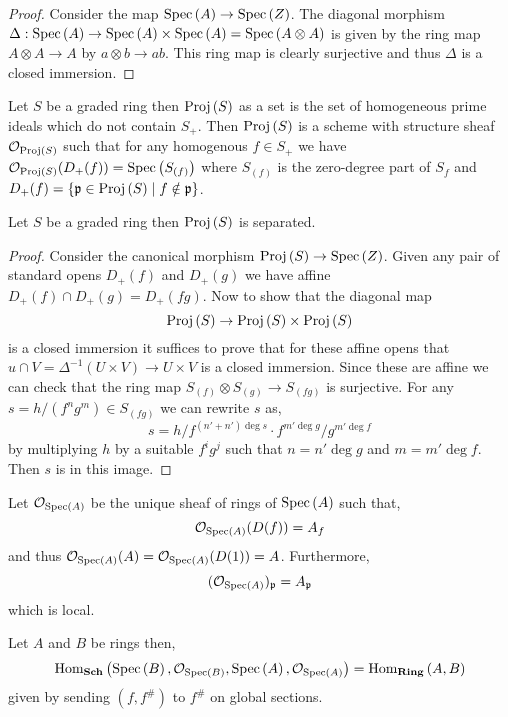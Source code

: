 \documentclass[12pt]{article}
\begin{document}
\begin{proof}
Consider the map $\mathrm{Spec}\left( A \right) \to \mathrm{Spec}\left( Z \right)$. The diagonal morphism $\Delta : \mathrm{Spec}\left( A \right) \to \mathrm{Spec}\left( A \right) \times \mathrm{Spec}\left( A \right) = \mathrm{Spec}\left( A \otimes A \right)$ is given by the ring map $A \otimes A \to  A$ by $a \otimes b \to ab$. This ring map is clearly surjective and thus $\Delta$ is a closed immersion. 
\end{proof}

\begin{definition}
Let $S$ be a graded ring then $\mathrm{Proj}\left( S \right)$ as a set is the set of homogeneous prime ideals which do not contain $S_+$. Then $\mathrm{Proj}\left( S \right)$ is a scheme with structure sheaf $\mathcal{O}_{\mathrm{Proj}\left( S \right)}$ such that for any homogenous $f \in S_+$ we have $\mathcal{O}_{\mathrm{Proj}\left( S \right)}(D_+(f)) = \mathrm{Spec}\left( S_{(f)} \right)$ where $S_{(f)}$ is the zero-degree part of $S_f$ and $D_+(f) = \{ \mathfrak{p} \in \mathrm{Proj}\left( S \right) \mid f \notin \mathfrak{p} \}$. 
\end{definition}

\begin{proposition}
Let $S$ be a graded ring then $\mathrm{Proj}\left( S \right)$ is separated. 
\end{proposition}

\begin{proof}
Consider the canonical morphism $\mathrm{Proj}\left( S \right) \to \mathrm{Spec}\left( Z \right)$. Given any pair of standard opens $D_+(f)$ and $D_+(g)$ we have affine $D_+(f) \cap D_+(g) = D_+(fg)$. Now to show that the diagonal map
\[ \mathrm{Proj}\left( S \right) \to \mathrm{Proj}\left( S \right) \times \mathrm{Proj}\left( S \right) \]
is a closed immersion it suffices to prove that for these affine opens that $u \cap V = \Delta^{-1}(U \times V) \to U \times V$ is a closed immersion. Since these are affine we can check that the ring map $S_{(f)} \otimes S_{(g)} \to S_{(fg)}$ is surjective. For any $s = h/(f^n g^m) \in S_{(fg)}$ we can rewrite $s$ as,
\[ s = h/f^{(n' + n') \deg{s}} \cdot f^{m' \deg{g}} / g^{m' \deg{f}} \]
by multiplying $h$ by a suitable $f^ig^j$ such that $n = n' \deg{g}$ and $m = m' \deg{f}$. Then $s$ is in this image. 
\end{proof}

\begin{definition}
Let $\mathcal{O}_{\mathrm{Spec}\left( A \right)}$ be the unique sheaf of rings of $\mathrm{Spec}\left( A \right)$ such that,
\[ \mathcal{O}_{\mathrm{Spec}\left( A \right)}(D(f)) = A_f \]
and thus $\mathcal{O}_{\mathrm{Spec}\left( A \right)}(A) = \mathcal{O}_{\mathrm{Spec}\left( A \right)}(D(1)) = A$. Furthermore,
\[ (\mathcal{O}_{\mathrm{Spec}\left( A \right)})_{\mathfrak{p}} = A_{\mathfrak{p}} \]
which is local. 
\end{definition}

\begin{proposition}
Let $A$ and $B$ be rings then,
\[ \text{Hom}_{\mathbf{Sch}}\left( \mathrm{Spec}\left( B \right), \mathcal{O}_{\mathrm{Spec}\left( B \right)}, \mathrm{Spec}\left( A \right), \mathcal{O}_{\mathrm{Spec}\left( A \right)} \right) = \text{Hom}_{\mathbf{Ring}}\left( A, B \right) \]
given by sending $(f, f^\#)$ to $f^\#$ on global sections. 
\end{proposition}
\end{document}
